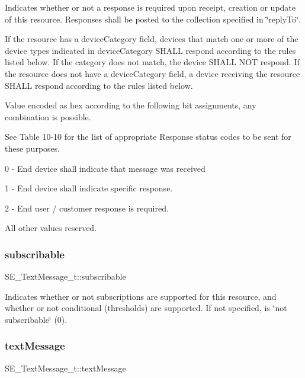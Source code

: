 Indicates whether or not a response is required upon receipt, creation or update of this resource. Responses shall be posted to the collection specified in \char`\"{}reply\+To\char`\"{}.

If the resource has a device\+Category field, devices that match one or more of the device types indicated in device\+Category S\+H\+A\+LL respond according to the rules listed below. If the category does not match, the device S\+H\+A\+LL N\+OT respond. If the resource does not have a device\+Category field, a device receiving the resource S\+H\+A\+LL respond according to the rules listed below.

Value encoded as hex according to the following bit assignments, any combination is possible.

See Table 10-\/10 for the list of appropriate Response status codes to be sent for these purposes.

0 -\/ End device shall indicate that message was received

1 -\/ End device shall indicate specific response.

2 -\/ End user / customer response is required.

All other values reserved. \mbox{\label{group__TextMessage_gaac87d3ebb2b9b25e58bec8fe5d86b102}} 
\subsubsection{\texorpdfstring{subscribable}{subscribable}}
{\footnotesize\ttfamily S\+E\+\_\+\+Text\+Message\+\_\+t\+::subscribable}

Indicates whether or not subscriptions are supported for this resource, and whether or not conditional (thresholds) are supported. If not specified, is \char`\"{}not subscribable\char`\"{} (0). \mbox{\label{group__TextMessage_ga681f5ae7a8773a4381420445c9ae75ec}} 
\subsubsection{\texorpdfstring{text\+Message}{textMessage}}
{\footnotesize\ttfamily S\+E\+\_\+\+Text\+Message\+\_\+t\+::text\+Message}

